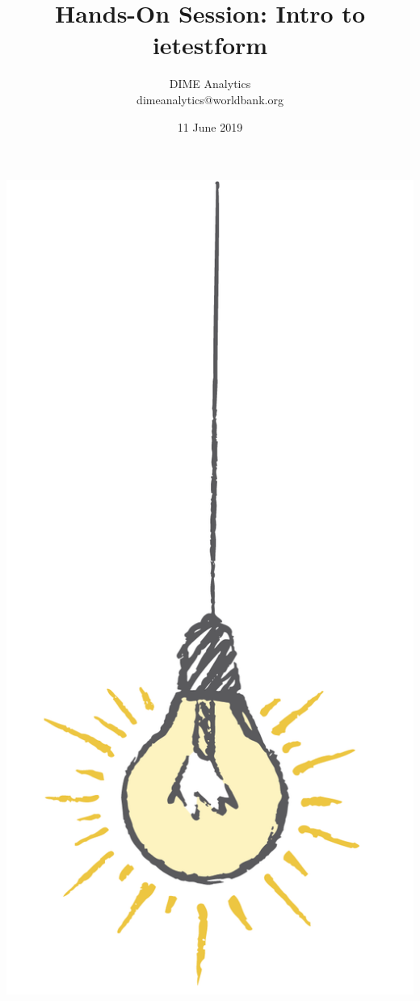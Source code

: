 \documentclass{tufte-handout}
\title{Hands-On Session: Intro to ietestform}
\author{DIME Analytics \\ dimeanalytics@worldbank.org}
\date{11 June 2019}  %
\begin{document}
\maketitle%

\begin{marginfigure}%
  \includegraphics[width=\linewidth]{img/light.png}
\end{marginfigure}
\end{document}
